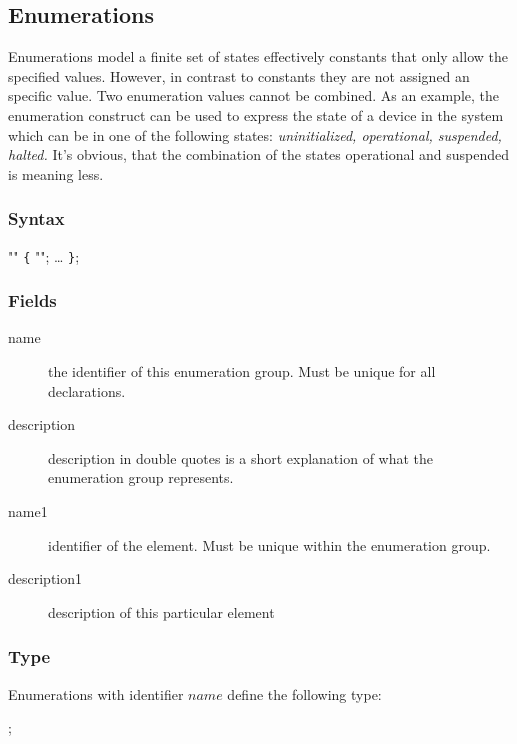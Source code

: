 \documentclass[a4paper,11pt,twoside]{report}
\begin{document}
{{\subsection{Enumerations}
\label{sec:decl:enums}

Enumerations model a finite set of states effectively constants that only allow
the specified values. However, in contrast to constants they are not assigned
an specific value. Two enumeration values cannot be combined. As an example, 
the enumeration construct can be used to express the state of a device in the
system which can be in one of the following states: \emph{uninitialized, 
operational, suspended, halted.} It's obvious, that the combination of the 
states operational
and suspended is meaning less.


\subsubsection{Syntax}

\begin{syntax}
  "" \verb+{+
     "";
    \ldots
\verb+}+;
\end{syntax}

\subsubsection{Fields}

\begin{description}
    \item[name] the identifier of this enumeration group. Must be unique for 
                all declarations.
    
    \item [description] description in double quotes is a short explanation of
                        what the enumeration group represents.
    
    \item [name1] identifier of the element. Must be unique within the 
                  enumeration group.   
    
    \item [description1] description of this particular element
    
\end{description}

\subsubsection{Type}
Enumerations with identifier $name$ define the following type:
\begin{syntax}
 ;
\end{syntax}

}}
\end{document}
